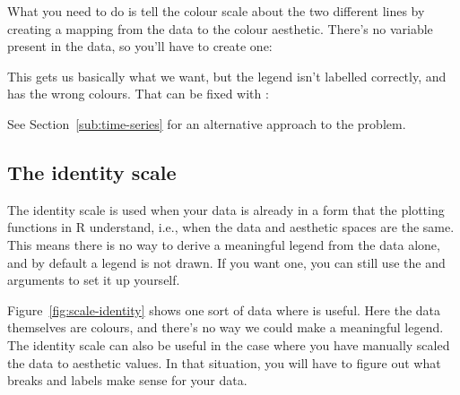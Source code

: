 What you need to do is tell the colour scale about the two different lines by creating a mapping from the data to the colour aesthetic. There's no variable present in the data, so you'll have to create one:

% 


This gets us basically what we want, but the legend isn't labelled correctly, and has the wrong colours.  That can be fixed with :

% 


See Section~\ref{sub:time-series} for an alternative approach to the problem.

\subsection{The identity scale}
\label{sub:scale-identity}

The identity scale is used when your data is already in a form that the plotting functions in R understand, i.e., when the data and aesthetic spaces are the same.  This means there is no way to derive a meaningful legend from the data alone, and by default a legend is not drawn.  If you want one, you can still use the  and  arguments to set it up yourself.  

Figure~\ref{fig:scale-identity} shows one sort of data where  is useful.  Here the data themselves are colours, and there's no way we could make a meaningful legend.  The identity scale can also be useful in the case where you have manually scaled the data to aesthetic values.  In that situation, you will have to figure out what breaks and labels make sense for your data.

% 



